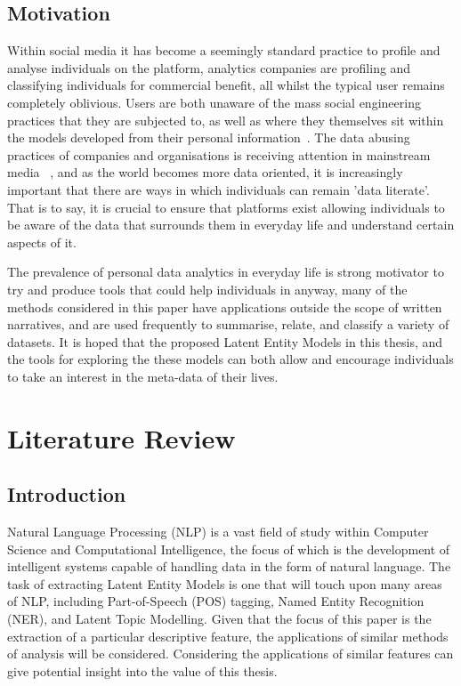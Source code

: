 \documentclass[10pt]{report}
\begin{document}
\section{Motivation}
Within social media it has become a seemingly standard practice to profile and analyse individuals on the platform, analytics companies are profiling and classifying individuals for commercial benefit, all whilst the typical user remains completely oblivious. Users are both unaware of the mass social engineering practices that they are subjected to, as well as where they themselves sit within the models developed from their personal information~\cite{Van_Kleek2018-iy}. The data abusing practices of companies and organisations is receiving attention in mainstream media ~\cite{Romm2018-cu}, and as the world becomes more data oriented, it is increasingly important that there are ways in which individuals can remain 'data literate'. That is to say, it is crucial to ensure that platforms exist allowing individuals to be aware of the data that surrounds them in everyday life and understand certain aspects of it.

The prevalence of personal data analytics in everyday life is strong motivator to try and produce tools that could help individuals in anyway, many of the methods considered in this paper have applications outside the scope of written narratives, and are used frequently to summarise, relate, and classify a variety of datasets. It is hoped that the proposed Latent Entity Models in this thesis, and the tools for exploring the these models can both allow and encourage individuals to take an interest in the meta-data of their lives.

%
%
%
%
\chapter{Literature Review}

\section{Introduction}
Natural Language Processing (NLP) is a vast field of study within Computer Science and Computational Intelligence, the focus of which is the development of intelligent systems capable of handling data in the form of natural language. The task of extracting Latent Entity Models is one that will touch upon many areas of NLP, including Part-of-Speech (POS) tagging, Named Entity Recognition (NER), and Latent Topic Modelling. Given that the focus of this paper is the extraction of a particular descriptive feature, the applications of similar methods of analysis will be considered. Considering the applications of similar features can give potential insight into the value of this thesis.
\end{document}
